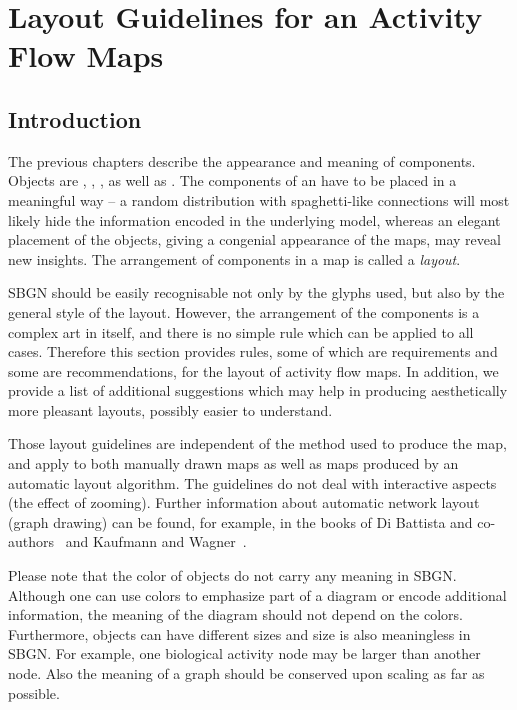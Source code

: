 \chapter{Layout Guidelines for an Activity Flow Maps}
\label{chp:af:layout}

\section{Introduction}

The previous chapters describe the appearance and meaning of \SBGNAFLone components. Objects are , , ,  as well as . The components of an \AFm have to be placed in a meaningful way -- a random distribution with spaghetti-like connections will most likely hide the information encoded in the underlying model, whereas an elegant placement of the objects, giving a congenial appearance of the maps, may reveal new insights. The arrangement of components in a map is called a \emph{layout}.

SBGN \AFs should be easily recognisable not only by the glyphs used, but also by the general style of the layout. However, the arrangement of the components is a complex art in itself, and there is no simple rule which can be applied to all cases. Therefore this
section provides rules, some of which are requirements and some are recommendations, for the layout of activity flow maps.
In addition, we provide a list of additional suggestions which may help in producing aesthetically more pleasant layouts, possibly easier to understand.

Those layout guidelines are independent of the method used to produce the map, and apply to both manually drawn maps as well as maps produced by an automatic layout algorithm. The guidelines do not deal with interactive aspects (\eg the effect of zooming). Further information about automatic network layout (graph drawing) can be found, for example, in the books of Di Battista and co-authors~\cite{DiBattista:1998} and Kaufmann and Wagner~\cite{Kaufmann:2001}.

Please note that the color of objects do not carry any meaning in SBGN. Although one can use colors to emphasize part of a diagram or encode additional information, the meaning of the diagram should not depend on the colors. Furthermore, objects can have different sizes and size is also meaningless in SBGN. For example, one biological activity node may be larger than another node. Also the meaning of a graph should be conserved upon scaling as far as possible.

